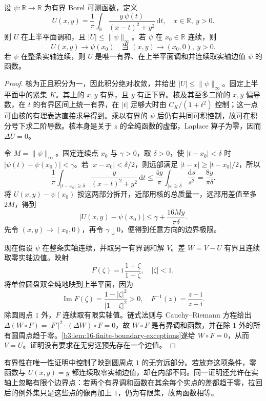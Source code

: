 \begin{theorem}\label{b3:thm:16-half-plane-poisson}
设 \(\psi:\mathbb R\to\mathbb R\) 为有界 Borel 可测函数，定义
\[
 U(x,y)=\frac1\pi\int_{\mathbb R}
       \frac{y\,\psi(t)}{(x-t)^2+y^2}\,\mathrm dt,
 \quad x\in\mathbb R,\ y>0.
\]
则 \(U\) 在上半平面调和，且 \(|U|\le\|\psi\|_\infty\)。若 \(\psi\) 在 \(x_0\in\mathbb R\) 连续，则
\[
 U(x,y)\longrightarrow\psi(x_0)
 \quad\text{当 }(x,y)\to(x_0,0),\ y>0.
\]
若 \(\psi\) 在整条实轴连续，则 \(U\) 是唯一有界、在上半平面调和并连续取实轴边值 \(\psi\) 的函数。
\end{theorem}
\begin{proof}
核为正且积分为一，因此积分绝对收敛，并给出 \(|U|\le\|\psi\|_\infty\)。固定上半平面中的紧集 \(K\)。其上的 \(x,y\) 有界，且 \(y\) 有正下界。核及其至多二阶的 \(x,y\) 偏导数，在 \(t\) 的有界区间上统一有界，在 \(|t|\) 足够大时由 \(C_K/(1+t^2)\) 控制；这一点可由核的有理表达直接求导得到。乘以有界的 \(\psi\) 后仍有共同可积控制，故可在积分号下求二阶导数。核本身是关于 \(z\) 的全纯函数的虚部，Laplace 算子为零，因而 \(\Delta U=0\)。

令 \(M=\|\psi\|_\infty\)。固定连续点 \(x_0\) 与 \(\gamma>0\)，取 \(\delta>0\)，使 \(|t-x_0|<\delta\) 时
\(|\psi(t)-\psi(x_0)|<\gamma\)。若 \(|x-x_0|<\delta/2\)，则远部满足
\(|t-x|\ge|t-x_0|/2\)，所以
\[
 \frac1\pi\int_{|t-x_0|\ge\delta}
       \frac{y}{(x-t)^2+y^2}\,\mathrm dt
 \le\frac{4y}{\pi}\int_{|s|\ge\delta}\frac{\mathrm ds}{s^2}
 =\frac{8y}{\pi\delta}.
\]
将 \(U(x,y)-\psi(x_0)\) 按这两部分拆开，近部用核的总质量一，远部用差值至多 \(2M\)，得到
\[
 |U(x,y)-\psi(x_0)|
 \le\gamma+\frac{16My}{\pi\delta}.
\]
先令 \((x,y)\to(x_0,0)\)，再令 \(\gamma\downarrow0\)，便得到任意方向的边界极限。

现在假设 \(\psi\) 在整条实轴连续，并取另一有界调和解 \(V\)。差 \(W=V-U\) 有界且连续取零实轴边值。映射
\[
 F(\zeta)=\mathrm i\,\frac{1+\zeta}{1-\zeta},
 \quad |\zeta|<1,
\]
将单位圆盘双全纯地映到上半平面，因为
\[
 \operatorname{Im}F(\zeta)=\frac{1-|\zeta|^2}{|1-\zeta|^2}>0,
 \quad
 F^{-1}(z)=\frac{z-\mathrm i}{z+\mathrm i}.
\]
除圆周点 \(1\) 外，\(F\) 连续取有限实轴值。链式法则与 Cauchy--Riemann 方程给出
\(\Delta(W\circ F)=|F'|^2\cdot(\Delta W)\circ F=0\)，故 \(W\circ F\) 是有界调和函数，并在除 \(1\) 外的所有圆周点趋于零。\cref{b3:lem:16-finite-boundary-exceptions}遂给 \(W\circ F=0\)，从而 \(V=U\)。证明没有要求在无穷远预先存在一个边值。

\end{proof}

有界性在唯一性证明中控制了映到圆周点 \(1\) 的无穷远部分。若放弃这项条件，零函数与 \(U(x,y)=y\) 都连续取零实轴边值，却在内部不同。同一证明还允许在实轴上忽略有限个边界点：若两个有界调和函数在其余每个实点的差都趋于零，拉回后的例外集只是这些点的像再加上 \(1\)，仍为有限集，故两函数相等。

